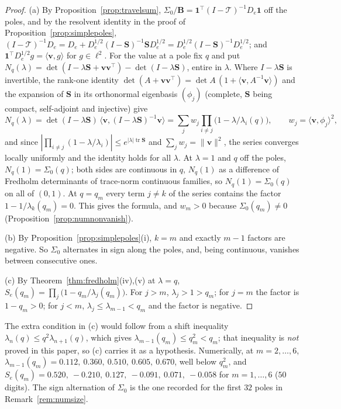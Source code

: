 \documentclass[11pt]{article}
\theoremstyle{plain}
\theoremstyle{definition}
\theoremstyle{remark}
\begin{document}
\begin{proof}
(a) By Proposition~\ref{prop:travelsum}, $\Sigma_0/\mathbf B=\mathbf 1^{\!\top}(I-\mathcal
T)^{-1}D_e\mathbf 1$ off the poles, and by the resolvent identity in the proof of
Proposition~\ref{prop:simplepoles},
$(I-\mathcal T)^{-1}D_e=D_e+D_e^{1/2}(I-\mathbf S)^{-1}\mathbf SD_e^{1/2}
=D_e^{1/2}(I-\mathbf S)^{-1}D_e^{1/2}$; and $\mathbf 1^{\!\top}D_e^{1/2}g=\langle\mathbf v,g\rangle$
for $g\in\ell^2$. For the value at a pole fix $q$ and put
$N_q(\lambda)=\det(I-\lambda\mathbf S+\mathbf v\mathbf v^{\!\top})-\det(I-\lambda\mathbf S)$, entire
in $\lambda$. Where $I-\lambda\mathbf S$ is invertible, the rank-one identity
$\det(A+\mathbf v\mathbf v^{\!\top})=\det A\,(1+\langle\mathbf v,A^{-1}\mathbf v\rangle)$ and the
expansion of $\mathbf S$ in its orthonormal eigenbasis $(\phi_j)$ (complete, $\mathbf S$ being
compact, self-adjoint and injective) give
\[
   N_q(\lambda)=\det(I-\lambda\mathbf S)\,\langle\mathbf v,(I-\lambda\mathbf S)^{-1}\mathbf v\rangle
   =\sum_jw_j\prod_{i\ne j}\bigl(1-\lambda/\lambda_i(q)\bigr),\qquad
   w_j=\langle\mathbf v,\phi_j\rangle^2 ,
\]
and since $|\prod_{i\ne j}(1-\lambda/\lambda_i)|\le e^{|\lambda|\operatorname{tr}\mathbf S}$ and
$\sum_jw_j=\|\mathbf v\|^2$, the series converges locally uniformly and the identity holds for all
$\lambda$. At $\lambda=1$ and $q$ off the poles, $N_q(1)=\Sigma_0(q)$; both sides are continuous in
$q$, $N_q(1)$ as a difference of Fredholm determinants of trace-norm continuous families, so
$N_q(1)=\Sigma_0(q)$ on all of $(0,1)$. At $q=q_m$ every term $j\ne k$ of the series contains the
factor $1-1/\lambda_k(q_m)=0$. This gives the formula, and $w_m>0$ because $\Sigma_0(q_m)\ne0$
(Proposition~\ref{prop:numnonvanish}).

(b) By Proposition~\ref{prop:simplepoles}\textup{(i)}, $k=m$ and exactly $m-1$ factors are negative.
So $\Sigma_0$ alternates in sign along the poles, and, being continuous, vanishes between
consecutive ones.

(c) By Theorem~\ref{thm:fredholm}\textup{(iv)},\textup{(v)} at $\lambda=q$,
$S_e(q_m)=\prod_j\bigl(1-q_m/\lambda_j(q_m)\bigr)$. For $j>m$, $\lambda_j>1>q_m$; for $j=m$ the
factor is $1-q_m>0$; for $j<m$, $\lambda_j\le\lambda_{m-1}<q_m$ and the factor is negative.
\end{proof}

\noindent The extra condition in (c) would follow from a shift inequality
$\lambda_n(q)\le q^2\lambda_{n+1}(q)$, which gives $\lambda_{m-1}(q_m)\le q_m^2<q_m$; that
inequality is \emph{not} proved in this paper, so (c) carries it as a hypothesis. Numerically, at
$m=2,\dots,6$, $\lambda_{m-1}(q_m)=0.112,\ 0.360,\ 0.510,\ 0.605,\ 0.670$, well below $q_m^2$, and
$S_e(q_m)=0.520,\ -0.210,\ 0.127,\ -0.091,\ 0.071,\ -0.058$ for $m=1,\dots,6$ ($50$ digits). The
sign alternation of $\Sigma_0$ is the one recorded for the first $32$ poles in
Remark~\ref{rem:numsize}.
\end{document}
